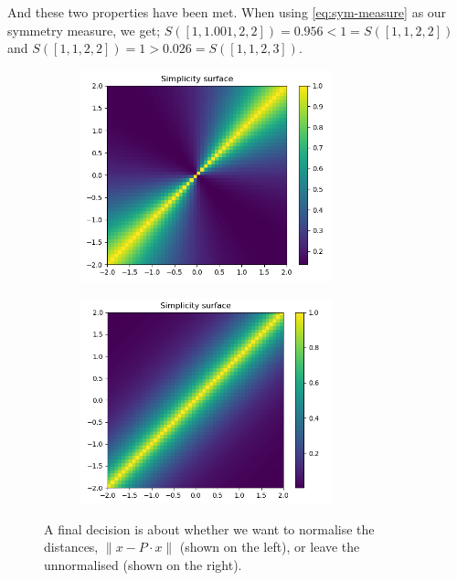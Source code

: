 And these two properties have been met. When using \ref{eq:sym-measure} as our symmetry measure, we get;
$S([1,1.001,2,2]) = 0.956 < 1 = S([1,1,2,2])$ and $S([1,1,2,2]) = 1  >  0.026 = S([1,1,2,3])$.

\begin{figure}[h!]
\centering
\begin{subfigure}{.5\textwidth}
  \centering
	\includegraphics[width=0.8\textwidth,height=0.25\textheight]{../../pictures/figures/complexity_surface_2d-normed.png}
  \label{fig:sub1}
\end{subfigure}%
\begin{subfigure}{.5\textwidth}
  \centering
	\includegraphics[width=0.8\textwidth,height=0.25\textheight]{../../pictures/figures/complexity_surface_2d-not-normed.png}
  \label{fig:sub2}
\end{subfigure}
\caption{A final decision is about whether we want to normalise the distances,
$\parallel x - P\cdot x \parallel$ (shown on the left), or leave the unnormalised (shown on the right).}
\label{fig:normalise-symmetry}
\end{figure}


